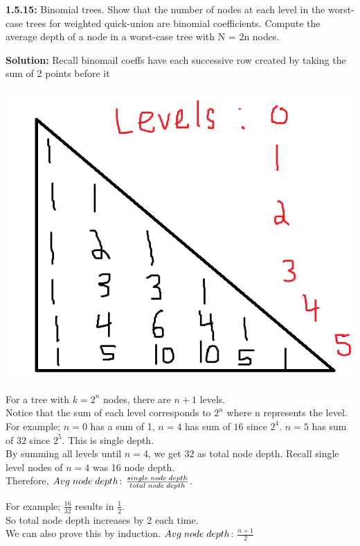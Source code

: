 \documentclass[11pt,fleqn]{article}
\begin{document}
\textbf{1.5.15:} Binomial trees. Show that the number of nodes at each level in the worst-case
trees for weighted quick-union are binomial coefficients. Compute the average depth of
a node in a worst-case tree with N = 2n nodes.

\textbf{Solution:} Recall binomail coeffs have each successive row created by taking the sum of 2 points before it\\

\begin{center}
	\includegraphics[scale = 1]{1.5.15-triangle.png}
	\end{center}
	
For a tree with $k=2^n$ nodes, there are $n+1$ levels.\\
Notice that the sum of each level corresponds to $2^n$ where n represents the level. For example; $n=0$ has a sum of 1, $n=4$ has sum of $16$ since $2^4$. $n=5$ has sum of $32$ since $2^5$. This is single depth.\\

By summing all levels until $n=4$, we get $32$ as total node depth. Recall single level nodes of $n=4$ was 16 node depth.\\

Therefore, $Avg \thickspace node \thickspace depth$: $\frac{single \thickspace node \thickspace depth}{total \thickspace node \thickspace depth}$.

For example; $\frac{16}{32}$ results in $\frac{1}{2}$.\\

So total node depth increases by 2 each time.\\

We can also prove this by induction. $Avg \thickspace node \thickspace depth$: $\frac{n+1}{2}$
\end{document}
